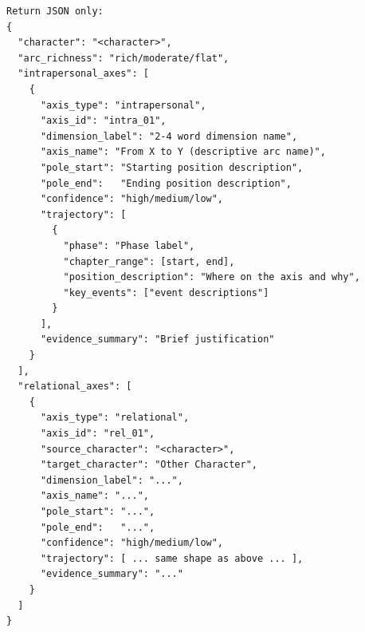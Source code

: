\documentclass{llmxive}
\begin{document}
\begin{table}[htbp]
\begin{lstlisting}[basicstyle=\ttfamily\scriptsize]
Return JSON only:
{
  "character": "<character>",
  "arc_richness": "rich/moderate/flat",
  "intrapersonal_axes": [
    {
      "axis_type": "intrapersonal",
      "axis_id": "intra_01",
      "dimension_label": "2-4 word dimension name",
      "axis_name": "From X to Y (descriptive arc name)",
      "pole_start": "Starting position description",
      "pole_end":   "Ending position description",
      "confidence": "high/medium/low",
      "trajectory": [
        {
          "phase": "Phase label",
          "chapter_range": [start, end],
          "position_description": "Where on the axis and why",
          "key_events": ["event descriptions"]
        }
      ],
      "evidence_summary": "Brief justification"
    }
  ],
  "relational_axes": [
    {
      "axis_type": "relational",
      "axis_id": "rel_01",
      "source_character": "<character>",
      "target_character": "Other Character",
      "dimension_label": "...",
      "axis_name": "...",
      "pole_start": "...",
      "pole_end":   "...",
      "confidence": "high/medium/low",
      "trajectory": [ ... same shape as above ... ],
      "evidence_summary": "..."
    }
  ]
}
\end{lstlisting}
\caption{Stage~i axis-induction prompt (run independently on each stream; the user message swaps \texttt{events\_json} for the state-stream's \texttt{psych\_summaries\_json}).}
\label{tab:prompt-axis-induction}
\end{table}
\end{document}
